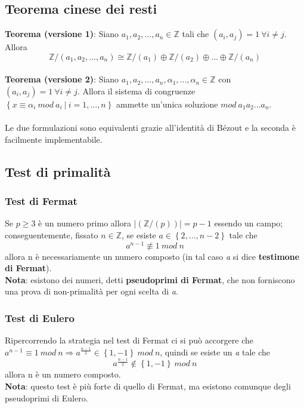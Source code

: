 \documentclass{article}
\begin{document}
	\subsection{Teorema cinese dei resti}
	\textbf{Teorema (versione 1)}: Siano \(a_1,a_2,...,a_n\in\mathbb{Z}\) tali che \((a_i,a_j)=1\ \forall i\neq j\). Allora
	\[\mathbb{Z}/(a_1,a_2,...,a_n)\cong \mathbb{Z}/(a_1)\oplus\mathbb{Z}/(a_2)\oplus...\oplus\mathbb{Z}/(a_n)\]\\
	\textbf{Teorema (versione 2)}:  Siano \(a_1,a_2,...,a_n,\alpha_1,...,\alpha_n\in\mathbb{Z}\) con \((a_i,a_j)=1\ \forall i\neq j\). Allora il sistema di congruenze \(\left\{x\equiv \alpha_i\ mod\ a_i\ |\ i=1,...,n\right\}\) ammette un'unica soluzione \(mod\ a_1a_2...a_n\).\\ \\
	Le due formulazioni sono equivalenti grazie all'identità di Bézout e la seconda è facilmente implementabile.
	\vspace{1cm}
	
	\vspace{1cm}
	\subsection{Test di primalità}
	\subsubsection{Test di Fermat}
	Se \(p\ge 3\) è un numero primo allora \(\left|(\mathbb{Z}/(p))\right|=p-1\) essendo un campo; conseguentemente, fissato \(n\in\mathbb{Z}\), se esiste \(a\in\left\{2,...,n-2\right\}\) tale che \[a^{n-1}\not\equiv 1\ mod\ n\]
	allora n è necessariamente un numero composto (in tal caso \textit{a} si dice \textbf{testimone di Fermat}).\\ \textbf{Nota}: esistono dei numeri, detti \textbf{pseudoprimi di Fermat}, che non forniscono una prova di non-primalità per ogni scelta di \textit{a}.
	\vspace{1cm}
	
	\vspace{1cm}
	\vspace{1cm}
	
	\vspace{1cm}
	
	\subsubsection{Test di Eulero}
	Ripercorrendo la strategia nel test di Fermat ci si può accorgere che \(a^{n-1}\equiv 1\ mod\ n\Rightarrow a^{\frac{n-1}{2}}\in \left\{1,-1\right\}\ mod\ n\), quindi se esiste un \textit{a} tale che 
	\[a^{\frac{n-1}{2}}\not\in \left\{1,-1\right\}\ mod\ n\]
	allora n è un numero composto.\\ \textbf{Nota}: questo test è più forte di quello di Fermat, ma esistono comunque degli pseudoprimi di Eulero. 
	\vspace{1cm}
	
	\vspace{1cm}
\end{document}

